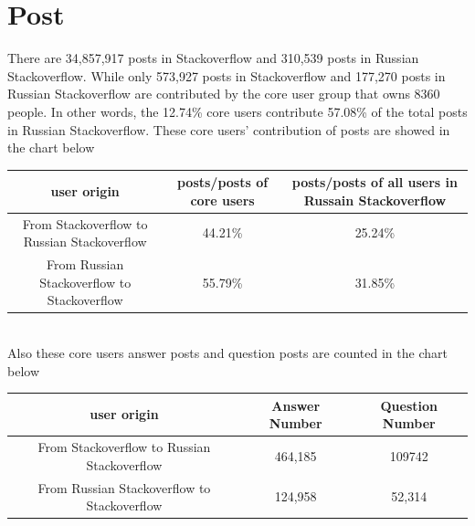 \documentclass[A4paper,twoside,twocolumn]{article}
\begin{document}
\section{Post}
There are 34,857,917 posts in Stackoverflow and 310,539 posts in Russian Stackoverflow. While only 573,927 posts in Stackoverflow and 177,270 posts in Russian Stackoverflow are contributed by the core user group that owns 8360 people. In other words, the 12.74\% core users contribute 57.08\% of the total posts in Russian Stackoverflow. These core users' contribution of posts are showed in the chart below
\begin{table}[!htbp]
\begin{tabular}{|c|c|c|}
\hline
user origin & posts/posts of core users & posts/posts of all users in Russain Stackoverflow\\
\hline
From Stackoverflow to Russian Stackoverflow& 44.21\%& 25.24\%\\
From Russian Stackoverflow to Stackoverflow& 55.79\%& 31.85\%\\
\hline
\end{tabular}
\end{table}
\\Also these core users answer posts and question posts are counted in the chart below
\begin{table}[!htbp]
\begin{tabular}{|c|c|c|}
\hline
user origin & Answer Number & Question Number\\
\hline
From Stackoverflow to Russian Stackoverflow&464,185&109742\\
From Russian Stackoverflow to Stackoverflow&124,958&52,314\\
\hline
\end{tabular}
\end{table}
\end{document}
